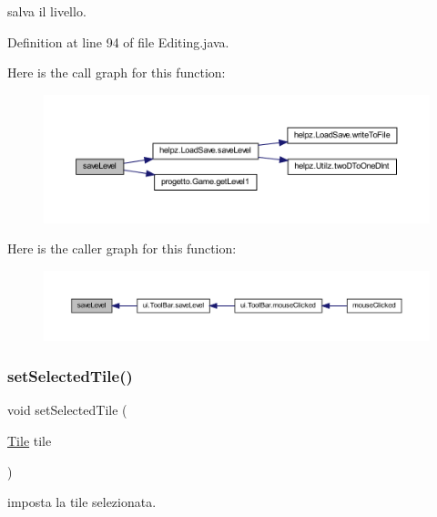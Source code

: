 salva il livello. 



Definition at line 94 of file Editing.\+java.

Here is the call graph for this function\+:
\nopagebreak
\begin{figure}[H]
\begin{center}
\leavevmode
\includegraphics[width=350pt]{classscenes_1_1_editing_af1c1bf274cd89c18726a992a073a7c6d_cgraph}
\end{center}
\end{figure}
Here is the caller graph for this function\+:\nopagebreak
\begin{figure}[H]
\begin{center}
\leavevmode
\includegraphics[width=350pt]{classscenes_1_1_editing_af1c1bf274cd89c18726a992a073a7c6d_icgraph}
\end{center}
\end{figure}
\mbox{\label{classscenes_1_1_editing_adaa2adb9d249f9b235fb9bb96aed4924}} 
\subsubsection{\texorpdfstring{set\+Selected\+Tile()}{setSelectedTile()}}
{\footnotesize\ttfamily void set\+Selected\+Tile (\begin{DoxyParamCaption}\item[{\hyperlink{classobjects_1_1_tile}{Tile}}]{tile }\end{DoxyParamCaption})}



imposta la tile selezionata. 


